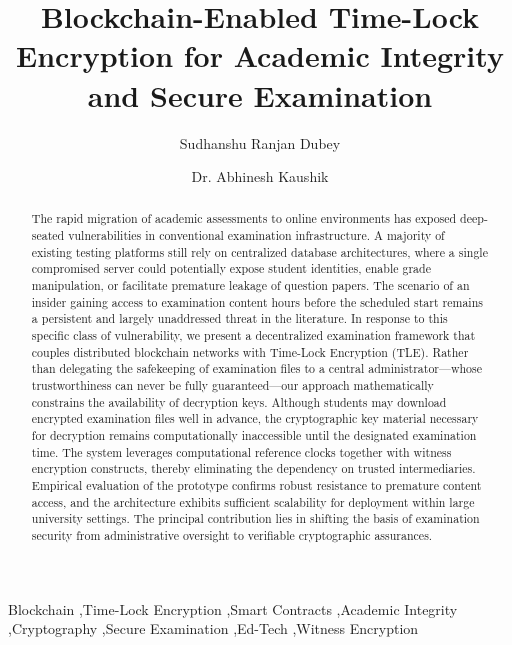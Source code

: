 \documentclass[final,5p,times]{elsarticle}
\begin{document}
\begin{frontmatter}

\title{Blockchain-Enabled Time-Lock Encryption for Academic Integrity and Secure Examination}

\author[inst1]{Sudhanshu Ranjan Dubey}
\author[inst1]{Dr. Abhinesh Kaushik}

\address[inst1]{Department of Computer Science, Indian Institute of Information Technology, Lucknow, Uttar Pradesh, India}

\begin{abstract}
The rapid migration of academic assessments to online environments has exposed deep-seated vulnerabilities in conventional examination infrastructure. A majority of existing testing platforms still rely on centralized database architectures, where a single compromised server could potentially expose student identities, enable grade manipulation, or facilitate premature leakage of question papers. The scenario of an insider gaining access to examination content hours before the scheduled start remains a persistent and largely unaddressed threat in the literature. In response to this specific class of vulnerability, we present a decentralized examination framework that couples distributed blockchain networks with Time-Lock Encryption (TLE). Rather than delegating the safekeeping of examination files to a central administrator—whose trustworthiness can never be fully guaranteed—our approach mathematically constrains the availability of decryption keys. Although students may download encrypted examination files well in advance, the cryptographic key material necessary for decryption remains computationally inaccessible until the designated examination time. The system leverages computational reference clocks together with witness encryption constructs, thereby eliminating the dependency on trusted intermediaries. Empirical evaluation of the prototype confirms robust resistance to premature content access, and the architecture exhibits sufficient scalability for deployment within large university settings. The principal contribution lies in shifting the basis of examination security from administrative oversight to verifiable cryptographic assurances.
\end{abstract}

\begin{keyword}
Blockchain \sep Time-Lock Encryption \sep Smart Contracts \sep Academic Integrity \sep Cryptography \sep Secure Examination \sep Ed-Tech \sep Witness Encryption
\end{keyword}

\end{frontmatter}
\end{document}
